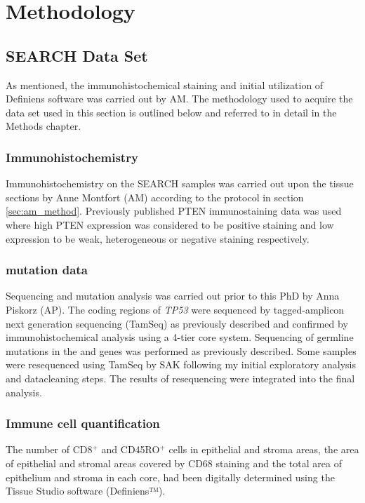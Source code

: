 \section[Methods]{Methodology}
\subsection{SEARCH Data Set}
As mentioned, the immunohistochemical staining and initial utilization of Definiens software was carried out by AM. The methodology used to acquire the data set used in this section is outlined below and referred to in detail in the Methods chapter. 

\subsubsection{Immunohistochemistry}
Immunohistochemistry on the SEARCH samples was carried out upon the tissue sections by Anne Montfort (AM) according to the protocol in section \ref{sec:am_method}. Previously published PTEN immunostaining data was used where high PTEN expression was considered to be positive staining and low expression to be weak, heterogeneous or negative staining respectively\cite{RN17}.

\subsubsection{ mutation data}

Sequencing and mutation analysis was carried out prior to this PhD by Anna Piskorz (AP). The coding regions of \textit{TP53} were sequenced by tagged-amplicon next generation sequencing (TamSeq) as previously described\cite{RN18} and confirmed by immunohistochemical analysis using a 4-tier core system\cite{RN19}. Sequencing of germline mutations in the   and  genes was performed as previously described\cite{RN20}. Some samples were resequenced using TamSeq by SAK following my initial exploratory analysis and datacleaning steps. The results of resequencing were integrated into the final analysis.

\subsubsection{Immune cell quantification}
 The number of CD8$^+$ and CD45RO$^+$ cells in epithelial and stroma areas, the area of epithelial and stromal areas covered by CD68 staining and the total area of epithelium and stroma in each core, had been digitally determined using the Tissue Studio software (Definiens™).

